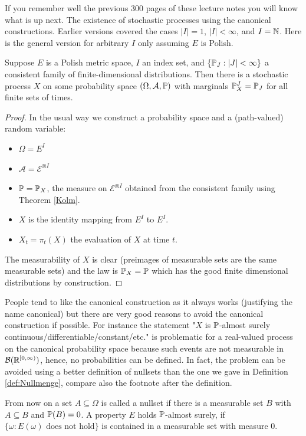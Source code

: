 If you remember well the previous 300 pages of these lecture notes you will know what is up next. The existence of stochastic processes using the canonical constructions. Earlier versions covered the cases $|I|=1$, $|I|<\infty$, and $I=\N$. Here is the general version for arbitrary $I$ only assuming $E$ is Polish.
\begin{lsuperwichtigersatzExistence}
	\begin{theorem}\label{KolmogorovProcess}
		Suppose $E$ is a Polish metric space, $I$ an index set, and $\{\P_J:|J|<\infty\}$ a consistent family of finite-dimensional distributions. Then there is a stochastic process $X$ on some probability space $(\Omega, \mathcal A, \P)$ with marginals $\P_X^J=\P_J$ for all finite sets of times.
	\end{theorem}
\end{lsuperwichtigersatzExistence}
\begin{proof}[Proof]
	In the usual way we construct a probability space and a (path-valued) random variable:
	\begin{itemize}
		\item $\Omega=E^I$
		\item $\mathcal A=\mathcal E^{\otimes I}$
		\item $\P=\P_X$, the measure on $\mathcal E^{\otimes I}$ obtained from the consistent family using Theorem \ref{Kolm}.
		\item $X$ is the identity mapping from $E^I$ to $E^I$.
		\item $X_t=\pi_t(X)$ the evaluation of $X$ at time $t$.
	\end{itemize}
	The measurability of $X$ is clear (preimages of measurable sets are the same measurable sets) and the law is $\P_X=\P$ which has the good finite dimensional distributions by construction.
\end{proof}
People tend to like the canonical construction as it always works (justifying the name canonical) but there are very good reasons to avoid the canonical construction if possible. For instance the statement "{}$X$ is $\P$-almost surely continuous/differentiable/constant/etc."{} is problematic for a real-valued process on the canonical probability space because such events are not measurable in $\mathcal B(\R^{[0,\infty)})$, hence, no probabilities can be defined. In fact, the problem can be avoided using a better definition of nullsets than the one we gave in Definition \ref{def:Nullmenge}, compare also the footnote after the definition.
\begin{lwarnhinweis}
	From now on a set $A\subseteq\Omega$ is called a nullset if there is a measurable set $B$ with $A\subseteq B$ and $\P(B)=0$. A property $E$ holds $\P$-almost surely, if $\{\omega: E(\omega) \text{ does not hold}\}$ is contained in a measurable set with measure $0$.
\end{lwarnhinweis}
